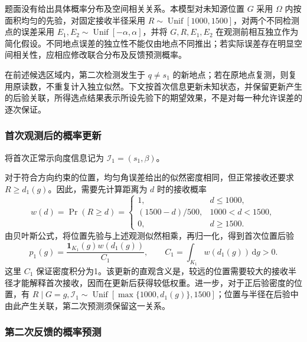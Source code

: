 题面没有给出具体概率分布及空间相关关系。本模型对未知源位置 \(G\) 采用 \(\Omega\) 内按面积均匀的先验，对固定接收半径采用 \(R\sim\operatorname{Unif}[1000,1500]\)，对两个不同检测点的误差采用 \(E_1,E_2\sim\operatorname{Unif}[-\alpha,\alpha]\)，并将 \(G,R,E_1,E_2\) 在观测前相互独立作为简化假设。不同地点误差的独立性不能仅由地点不同推出；若实际误差存在明显空间相关性，应相应修改联合分布及反馈预测概率。

在前述候选区域内，第二次检测发生于 \(q\ne s_1\) 的新地点；若在原地点复测，则复用原读数，不重复计入独立似然。下文按首次信息更新未知状态，并保留更新产生的后验关联，所得选点结果表示所设先验下的期望效果，不是对每一种允许误差的逐次保证。

\subsubsection{首次观测后的概率更新}

将首次正常示向度信息记为 \(\mathcal I_1=(s_1,\beta)\)。

对于符合方向约束的位置，均匀角误差给出的似然密度相同，但正常接收还要求 \(R\ge d_1(g)\)。因此，需要先计算距离为 \(d\) 时的接收概率
\begin{equation}
 w(d)=\Pr(R\ge d)=
 \begin{cases}
 1,&d\le1000,\\
 (1500-d)/500,&1000<d<1500,\\
 0,&d\ge1500.
 \end{cases}
\label{eq:q2-pair-weight}
\end{equation}
由贝叶斯公式，将位置先验与上述观测似然相乘，再归一化，得到首次位置后验
\begin{equation}
 p_1(g)=\frac{\mathbf1_{K_1}(g)w(d_1(g))}{C_1},
 \qquad C_1=\int_{K_1}w(d_1(g))\,\mathrm dg>0.
\label{eq:q2-pair-posterior}
\end{equation}
这里 \(C_1\) 保证密度积分为1。该更新的直观含义是，较远的位置需要较大的接收半径才能解释首次接收，因而在更新后获得较低权重。进一步，对于正后验密度的位置，有 \(R\mid G=g,\mathcal I_1\sim\operatorname{Unif}[\max\{1000,d_1(g)\},1500]\)；位置与半径在后验中由此产生关联，第二次预测须保留这一关系。

\subsubsection{第二次反馈的概率预测}


